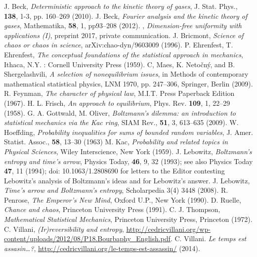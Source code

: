 \documentclass{article}
\numberwithin{equation}{section}
\begin{document}
\begin{thebibliography}{111111111111}
 {J. Beck}, \emph{Deterministic approach to the kinetic theory of gases},  {J. Stat. Phys.}, {\bf 138}, {1-3}, pp. 160--269 (2010).
 {J. Beck}, \emph{Fourier analysis and the kinetic theory of gases}, {Mathematika}, {\bf 58}, {1}, pp{93--208} (2012).
, \emph{Dimension-free uniformity with applications (I)}, preprint 2017, private communication.
 J. Bricmont, \emph{Science of chaos or chaos in science}, arXiv:chao-dyn/9603009 (1996).
 P. Ehrenfest, T. Ehrenfest, \emph{The conceptual foundations of the statistical approach in mechanics},
Ithaca, N.Y. : Cornell University Press (1959).
 C, Maes, K. Neto{\v{c}}n{\'y}, and
              B. Shergelashvili, \emph{A selection of nonequilibrium issues},
 in Methods of contemporary mathematical statistical physics, LNM 1970, pp. 247--306, Springer, Berlin (2009).
 R. Feynman, \emph{The character of physical law}, M.I.T. Press Paperback Edition (1967).
 H. L. Frisch, \emph{An approach to equilibrium}, Phys. Rev. {\bf 109}, 1, 22--29 (1958).
 G. A. Gottwald, M. Oliver, \emph{Boltzmann's dilemma: an introduction to statistical mechanics
              via the {K}ac ring}, {SIAM Rev.}, {\bf51}, 3, 613--635 (2009).
 W. Hoeffding, \emph{Probability inequalities for sums of bounded random variables}, J. Amer. Statist. Assoc.,
 {\bf 58}, 13--30 (1963)
 M. Kac, \emph{Probability and related topics in Physical Sciences}, Wiley Interscience, New York (1959).
 J. Lebowitz, \emph{Boltzmann's entropy and time's arrow}, Physics Today, {\bf 46}, 9, 32  (1993); see also Physics Today {\bf 47}, 11 (1994); doi: 10.1063/1.2808690 for letters to the Editor contesting Lebowitz's analysis of Boltzmann's ideas and for Lebowitz's answer.
 J. Lebowitz, \emph{Time's arrow and Boltzmann's entropy}, Scholarpedia 3(4) 3448 (2008).
 R. Penrose, \emph{The Emperor's New Mind}, Oxford U.P., New York (1990).
 D. Ruelle, \emph{Chance and chaos}, Princeton University Press (1991).
 C. J. Thompson, \emph{Mathematical Statistical Mechanics}, Princeton University Press, Princeton (1972).
 C. Villani, \emph{(Ir)reversibility and entropy}, \url{http://cedricvillani.org/wp-content/uploads/2012/08/P18.Bourbaphy_English.pdf}.
 C. Villani. \emph{Le temps est assasin\dots?}, \url{http://cedricvillani.org/le-temps-est-assassin/} (2014).
\end{thebibliography}
\end{document}
